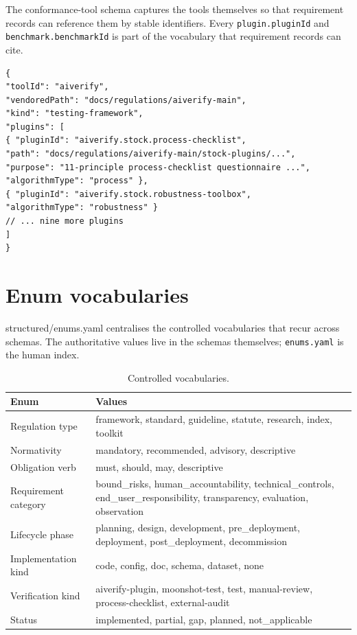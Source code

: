 \documentclass[11pt,a4paper,twoside]{report}
\newcommand{\corpus}{}
\begin{document}
The conformance-tool schema captures the tools themselves so that
requirement records can reference them by stable identifiers. Every
\texttt{plugin.pluginId} and \texttt{benchmark.benchmarkId} is part of the
vocabulary that requirement records can cite.

\begin{lstlisting}[language=jsonx,caption={Excerpt of
\corpus{structured/conformance-tools/aiverify.json}.}]
{
"toolId": "aiverify",
"vendoredPath": "docs/regulations/aiverify-main",
"kind": "testing-framework",
"plugins": [
{ "pluginId": "aiverify.stock.process-checklist",
"path": "docs/regulations/aiverify-main/stock-plugins/...",
"purpose": "11-principle process-checklist questionnaire ...",
"algorithmType": "process" },
{ "pluginId": "aiverify.stock.robustness-toolbox",
"algorithmType": "robustness" }
// ... nine more plugins
]
}
\end{lstlisting}

\section{Enum vocabularies}

\corpus{structured/enums.yaml} centralises the controlled vocabularies
that recur across schemas. The authoritative values live in the schemas
themselves; \texttt{enums.yaml} is the human index.

\begin{table}[h]
\centering
\small
\begin{tabularx}{\textwidth}{lX}
\toprule
\textbf{Enum} & \textbf{Values} \\
\midrule
Regulation type & framework, standard, guideline, statute, research, index, toolkit \\
Normativity    & mandatory, recommended, advisory, descriptive \\
Obligation verb & must, should, may, descriptive \\
Requirement category & bound\_risks, human\_accountability, technical\_controls, end\_user\_responsibility, transparency, evaluation, observation \\
Lifecycle phase & planning, design, development, pre\_deployment, deployment, post\_deployment, decommission \\
Implementation kind & code, config, doc, schema, dataset, none \\
Verification kind & aiverify-plugin, moonshot-test, test, manual-review, process-checklist, external-audit \\
Status & implemented, partial, gap, planned, not\_applicable \\
\bottomrule
\end{tabularx}
\caption{Controlled vocabularies.}
\label{tab:enums}
\end{table}
\clearpage
\end{document}
